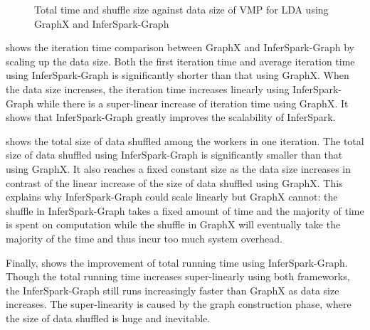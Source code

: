 \begin{figure}[h]
\centering
	\caption{Total time and shuffle size against data size of VMP for LDA using GraphX and InferSpark-Graph}
\end{figure}

 shows the iteration time
comparison between GraphX and InferSpark-Graph by scaling up the data size.
Both the first iteration time and average iteration time
using InferSpark-Graph is significantly shorter than that using
GraphX. When the data size increases, the iteration time increases linearly
using InferSpark-Graph while there is a super-linear increase of iteration
time using GraphX. It shows that InferSpark-Graph greatly improves the
scalability of InferSpark.

 shows the total size of data
shuffled among the workers in one iteration. The total size of data shuffled
using InferSpark-Graph is significantly smaller than that using GraphX. It
also reaches a fixed constant size as the data size increases in contrast of
the linear increase of the size of data shuffled using GraphX. This explains
why InferSpark-Graph could scale linearly but GraphX cannot: the shuffle in
InferSpark-Graph takes a fixed amount of time and the majority of time is
spent on computation while the shuffle in GraphX will eventually take the
majority of the time and thus incur too much system overhead.

Finally,  shows the improvement of
total running time using InferSpark-Graph. Though the total running time
increases super-linearly using both frameworks, the InferSpark-Graph still
runs increasingly faster than GraphX as data size increases. The
super-linearity is caused by the graph construction phase, where the size of
data shuffled is huge and inevitable.

